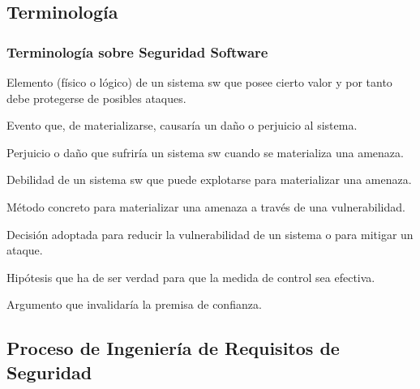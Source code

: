 \documentclass[a4paper,slidestop,xcolor=pst,dvips,blue]{beamer}
\begin{document}
\subsection{Terminología}

\begin{frame}[c]
    \frametitle{Terminología sobre Seguridad Software}
    \begin{description}[<+->]
        \item[Activo] Elemento (físico o lógico) de un sistema sw que posee cierto valor y por tanto debe protegerse de posibles ataques.
        \item[Amenazas] Evento que, de materializarse, causaría un daño o perjuicio al sistema.
        \item[Exposición] Perjuicio o daño que sufriría un sistema sw cuando se materializa una amenaza.
        \item[Vulnerabilidad] Debilidad de un sistema sw que puede explotarse para materializar una amenaza.
        \item[Ataque] Método concreto para materializar una amenaza a través de una vulnerabilidad.
        \item[Medida de Control] Decisión adoptada para reducir la vulnerabilidad de un sistema o para mitigar un ataque.
        \item[Premisa de Confianza] Hipótesis que ha de ser verdad para que la medida de control sea efectiva.
        \item[Contraargumento] Argumento que invalidaría la premisa de confianza.
    \end{description}
\end{frame}

\subsection{Proceso de Ingeniería de Requisitos de Seguridad}
\end{document}
